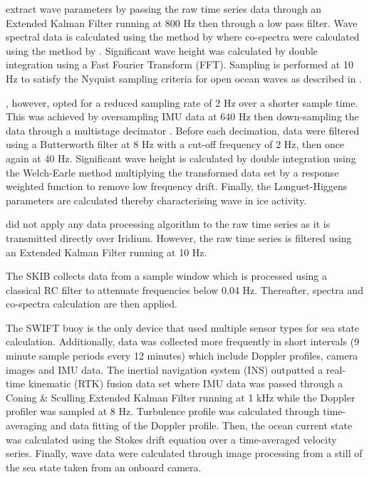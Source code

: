 \textcite{rabault2019open} extract wave parameters by passing the raw time series data through an Extended Kalman Filter running at 800 Hz then through a low pass filter. Wave spectral data is calculated using the method by \textcite{earle1996nondirectional} where co-spectra were calculated using the method by \textcite{kuik1988method}. Significant wave height was calculated by double integration using a Fast Fourier Transform (FFT). Sampling is performed at 10 Hz to satisfy the Nyquist sampling criteria for open ocean waves as described in \cite{rabault2019open,earle1996nondirectional}.

\textcite{kohout2015device}, however, opted for a reduced sampling rate of 2 Hz over a shorter sample time. This was achieved by oversampling IMU data at 640 Hz then down-sampling the data through a multistage decimator \cite{kohout2015device}. Before each decimation, data were filtered using a Butterworth filter at 8 Hz with a cut-off frequency of 2 Hz, then once again at 40 Hz. Significant wave height is calculated by double integration using the Welch-Earle method \cite{earle1996nondirectional,welch1967use} multiplying the transformed data set by a response weighted function to remove low frequency drift. Finally, the Longuet-Higgens parameters are calculated thereby characterising wave in ice activity.

\textcite{doble2017robust} did not apply any data processing algorithm to the raw time series as it is transmitted directly over Iridium. However, the raw time series is filtered using an Extended Kalman Filter running at 10 Hz.

The SKIB collects data from a sample window which is processed using a classical RC filter to attenuate frequencies below 0.04 Hz. Thereafter, \textcite{earle1996nondirectional} spectra and co-spectra calculation are then applied.

The SWIFT buoy is the only device that used multiple sensor types for sea state calculation. Additionally, data was collected more frequently in short intervals (9 minute sample periods every 12 minutes) which include Doppler profiles, camera images and IMU data. The inertial navigation system (INS) outputted a real-time kinematic (RTK) fusion data set where IMU data was passed through a Coning \& Sculling Extended Kalman Filter running at 1 kHz \cite{thomson2012wave} while the Doppler profiler was sampled at 8 Hz. Turbulence profile was calculated through time-averaging and data fitting of the Doppler profile. Then, the ocean current state was calculated using the Stokes drift equation over a time-averaged velocity series. Finally, wave data were calculated  through image processing from a still of the sea state taken from an onboard camera.

